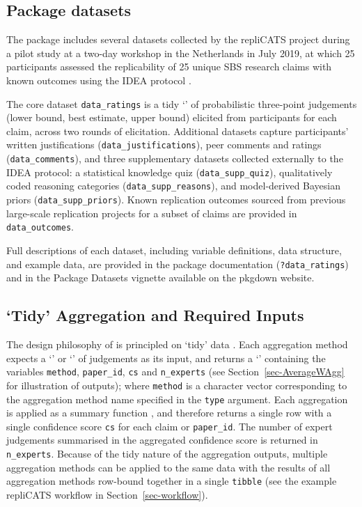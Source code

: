 \documentclass[article]{jss}
\newcommand{\class}[1]{`\code{#1}'}
\begin{document}
\subsection{Package datasets}\label{package-datasets}

The  package includes several datasets collected by the
repliCATS project during a pilot study at a two-day workshop in the
Netherlands in July 2019, at which 25 participants assessed the
replicability of 25 unique SBS research claims with known outcomes using
the IDEA protocol \citep{Hanea2021}.

The core dataset \texttt{data\_ratings} is a tidy \class{data.frame} of
probabilistic three-point judgements (lower bound, best estimate, upper
bound) elicited from participants for each claim, across two rounds of
elicitation. Additional datasets \citep{Fraser:2021} capture
participants' written justifications (\texttt{data\_justifications}),
peer comments and ratings (\texttt{data\_comments}), and three
supplementary datasets collected externally to the IDEA protocol: a
statistical knowledge quiz (\texttt{data\_supp\_quiz}), qualitatively
coded reasoning categories (\texttt{data\_supp\_reasons}), and
model-derived Bayesian priors (\texttt{data\_supp\_priors}). Known
replication outcomes sourced from previous large-scale replication
projects
\citep{Klein2014, Klein2018ManyL2, Ebersole2016, Camerer2018, aac4716}
for a subset of claims are provided in \texttt{data\_outcomes}.

Full descriptions of each dataset, including variable definitions, data
structure, and example data, are provided in the  package
documentation (\texttt{?data\_ratings}) and in the Package Datasets
vignette available on the  pkgdown website.

\subsection{`Tidy' Aggregation and Required
Inputs}\label{tidy-aggregation-and-required-inputs}

The design philosophy of  is principled on `tidy' data
\citep{Wickham:2014vp}. Each aggregation method expects a
\class{data.frame} or \class{tibble} of judgements as its input, and
returns a \class{tibble} containing the variables \texttt{method},
\texttt{paper\_id}, \texttt{cs} and \texttt{n\_experts} (see
Section~\ref{sec-AverageWAgg} for illustration of outputs); where
\texttt{method} is a character vector corresponding to the aggregation
method name specified in the \texttt{type} argument. Each aggregation is
applied as a summary function \citep{Wickham2017R}, and therefore
returns a single row with a single confidence score \texttt{cs} for each
claim or \texttt{paper\_id}. The number of expert judgements summarised
in the aggregated confidence score is returned in \texttt{n\_experts}.
Because of the tidy nature of the aggregation outputs, multiple
aggregation methods can be applied to the same data with the results of
all aggregation methods row-bound together in a single \texttt{tibble}
(see the example repliCATS workflow in Section~\ref{sec-workflow}).
\end{document}
